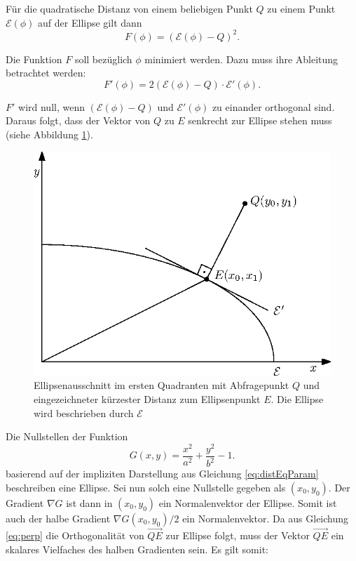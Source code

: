 Für die quadratische Distanz von einem beliebigen Punkt $Q$ zu einem Punkt $\mathcal{E}(\phi)$ auf der Ellipse gilt dann
\begin{equation}
	F(\phi) = \left(\mathcal{E}(\phi) - Q\right)^2.
\end{equation}

Die Funktion $F$ soll bezüglich $\phi$ minimiert werden. Dazu muss ihre Ableitung betrachtet werden:
\begin{equation}\label{eq:perp}
F'(\phi) = 2\left(\mathcal{E}(\phi) - Q\right) \cdot \mathcal{E}'(\phi).
\end{equation}

$F'$ wird null, wenn $\left(\mathcal{E}(\phi) - Q\right)$ und $ \mathcal{E}'(\phi)$ zu einander orthogonal sind. Daraus folgt, dass der Vektor von $Q$ zu $E$ senkrecht zur Ellipse stehen muss (siehe Abbildung \ref{fig:ellipseDist}).


\begin{figure}[!htb]
	\centering
	\includegraphics[scale=.9]{images/ellipseQuery.eps}
	\caption{Ellipsenausschnitt im ersten Quadranten mit Abfragepunkt $Q$ und eingezeichneter kürzester Distanz zum Ellipsenpunkt $E$. Die Ellipse wird beschrieben durch $\mathcal{E}$}
	\label{fig:ellipseDist}
\end{figure}

Die Nullstellen der Funktion
\begin{equation} \label{eq:ellipseDistEq}
	G(x,y) = \frac{x^2}{a^2} + \frac{y^2}{b^2} - 1.
\end{equation}
basierend auf der impliziten Darstellung aus Gleichung \ref{eq:distEqParam}
beschreiben eine Ellipse. Sei nun solch eine Nullstelle gegeben als $(x_0,y_0)$. Der Gradient $\nabla G$ ist dann in $(x_0,y_0)$ ein Normalenvektor der Ellipse. Somit ist auch der halbe Gradient $\nabla G(x_0,y_0)/2$ ein Normalenvektor. Da aus Gleichung \ref{eq:perp} die Orthogonalität von $\overrightarrow{QE}$ zur Ellipse folgt,  muss der Vektor  $\overrightarrow{QE}$ ein skalares Vielfaches des halben Gradienten sein. Es gilt somit:

